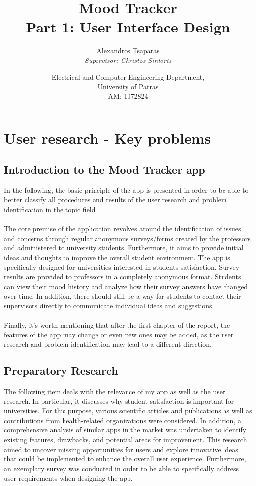 \documentclass[11pt]{report}
\title{\Huge \textbf{Mood Tracker}\vspace{2mm} \\
    \large Part 1: User Interface Design}
\author{\vspace*{1cm}\Large Alexandros Tsaparas
\\ \textit{Supervisor: Christos Sintoris}
\and Electrical and Computer Engineering Department,
\\University of Patras\vspace{5mm} \\
AM: 1072824}
\date{}
\begin{document}
\maketitle 
\tableofcontents

\chapterfont{\LARGE \centering}
\chaptertitlefont{\Large \centering}
\chapter{User research - Key problems}

\section{Introduction to the Mood Tracker app}

In the following, the basic principle of the app is presented in order to be able to better classify all procedures and results of the user research and problem identification in the topic field.\\ \\
The core premise of the application revolves around the identification of issues and concerns through regular anonymous surveys/forms created by the professors and administered to university students. Furthermore, it aims to provide initial ideas and thoughts to improve the overall student environment. The app is specifically designed for universities interested in students satisfaction. Survey results are provided to professors in a completely anonymous format. Students can view their mood history and analyze how their survey answers have changed over time. In addition, there should still be a way for students to contact their supervisors directly to communicate individual ideas and suggestions.\\ \\
Finally, it's worth mentioning that after the first chapter of the report, the features of the app may change or even new ones may be added, as the user research and problem identification may lead to a different direction.

\section{Preparatory Research}

The following item deals with the relevance of my app as well as the user research. In particular, it discusses why student satisfaction is important for universities. For this purpose, various scientific articles and publications as well as contributions from health-related organizations were considered. In addition, a comprehensive analysis of similar apps in the market was undertaken to identify existing features, drawbacks, and potential areas for improvement. This research aimed to uncover missing opportunities for users and explore innovative ideas that could be implemented to enhance the overall user experience. Furthermore, an exemplary survey was conducted in order to be able to specifically address user requirements when designing the app.
\end{document}
